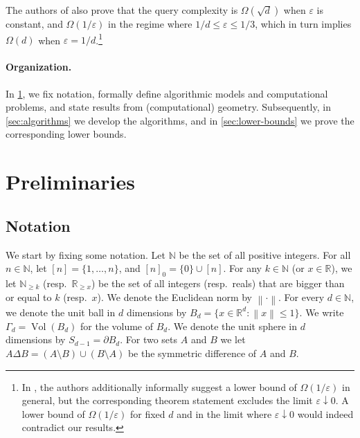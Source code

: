 \documentclass[11pt]{article}
\newcommand{\N}{\ensuremath{\mathbb{N}}}
\newcommand{\R}{\ensuremath{\mathbb{R}}}
\newcommand{\norm}[1]{\ensuremath{\left\|#1\right\|}}
\DeclareMathOperator{\Vol}{Vol}
\begin{document}
\begin{itemize}
        The authors of \cite{chakrabarti2023quantum} also prove that the query complexity is $\Omega(\sqrt{d})$ when $\varepsilon$ is constant, and $\Omega(1/\varepsilon)$ in the regime where $1/d \leq \varepsilon \leq 1/3$, which in turn implies $\Omega(d)$ when $\varepsilon = 1/d$.\footnote{In \cite{chakrabarti2023quantum}, the authors additionally informally suggest a lower bound of $\Omega(1/\varepsilon)$ in general, but the corresponding theorem statement excludes the limit $\varepsilon \downarrow 0$. A lower bound of $\Omega(1/\varepsilon)$ for fixed $d$ and in the limit where $\varepsilon \downarrow 0$ would indeed contradict our results.}
    \end{itemize}

    \paragraph{Organization.}

    In \cref{sec:preliminaries}, we fix notation, formally define algorithmic models and computational problems, and state results from (computational) geometry. Subsequently, in \cref{sec:algorithms} we develop the algorithms, and in \cref{sec:lower-bounds} we prove the corresponding lower bounds.

    \section{Preliminaries}
    \label{sec:preliminaries}

    \subsection{Notation}

    We start by fixing some notation. Let $\N$ be the set of all positive integers. For all $n \in \N$, let $[n] = \{1, \dots, n\}$, and $[n]_0 = \{0\} \cup [n]$. For any $k \in \N$ (or $x \in \R$), we let $\N_{\geq k}$ (resp.\ $\R_{\geq x}$) be the set of all integers (resp.\ reals) that are bigger than or equal to $k$ (resp.~$x$). We denote the Euclidean norm by $\norm{\cdot}$. For every $d \in \N$, we denote the unit ball in $d$ dimensions by $B_d = \{x \in \R^d : \norm{x} \leq 1\}$. We write $\Gamma_d = \Vol(B_d)$ for the volume of $B_d$. We denote the unit sphere in $d$ dimensions by $S_{d-1} = \partial B_d$. For two sets  $A$ and $B$ we let $A \Delta B = (A \setminus B) \cup (B \setminus A)$ be the symmetric difference of $A$ and $B$.
\end{document}
